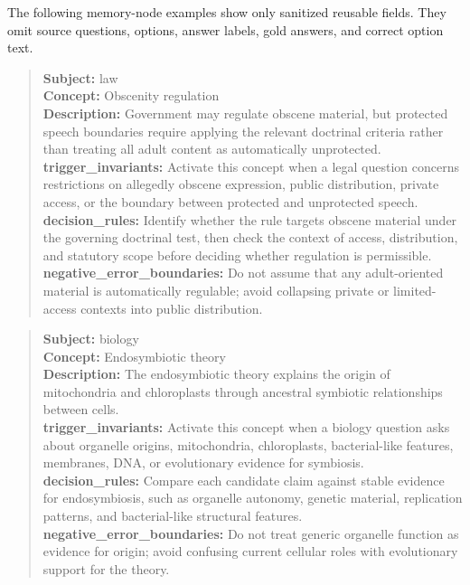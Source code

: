 \documentclass[11pt]{article}
\begin{document}
The following memory-node examples show only sanitized reusable fields. They omit source questions, options, answer labels, gold answers, and correct option text.

\begin{quote}\small
\textbf{Subject:} law\\
\textbf{Concept:} Obscenity regulation\\
\textbf{Description:} Government may regulate obscene material, but protected speech boundaries require applying the relevant doctrinal criteria rather than treating all adult content as automatically unprotected.\\
\textbf{trigger\_invariants:} Activate this concept when a legal question concerns restrictions on allegedly obscene expression, public distribution, private access, or the boundary between protected and unprotected speech.\\
\textbf{decision\_rules:} Identify whether the rule targets obscene material under the governing doctrinal test, then check the context of access, distribution, and statutory scope before deciding whether regulation is permissible.\\
\textbf{negative\_error\_boundaries:} Do not assume that any adult-oriented material is automatically regulable; avoid collapsing private or limited-access contexts into public distribution.
\end{quote}

\begin{quote}\small
\textbf{Subject:} biology\\
\textbf{Concept:} Endosymbiotic theory\\
\textbf{Description:} The endosymbiotic theory explains the origin of mitochondria and chloroplasts through ancestral symbiotic relationships between cells.\\
\textbf{trigger\_invariants:} Activate this concept when a biology question asks about organelle origins, mitochondria, chloroplasts, bacterial-like features, membranes, DNA, or evolutionary evidence for symbiosis.\\
\textbf{decision\_rules:} Compare each candidate claim against stable evidence for endosymbiosis, such as organelle autonomy, genetic material, replication patterns, and bacterial-like structural features.\\
\textbf{negative\_error\_boundaries:} Do not treat generic organelle function as evidence for origin; avoid confusing current cellular roles with evolutionary support for the theory.
\end{quote}
\end{document}
